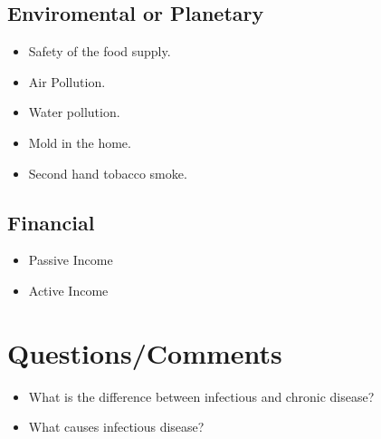 \documentclass[]{article}
\begin{document}
\subsection{Enviromental or Planetary}
\begin{itemize}
	\item Safety of the food supply.
	\item Air Pollution.
	\item Water pollution.
	\item Mold in the home.
	\item Second hand tobacco smoke.
\end{itemize}

\subsection{Financial}
\begin{itemize}
	\item Passive Income
	\item Active Income
\end{itemize}

\section{Questions/Comments}
\begin{itemize}
	\item What is the difference between infectious and chronic disease?
	\item What causes infectious disease?
\end{itemize}
\end{document}
